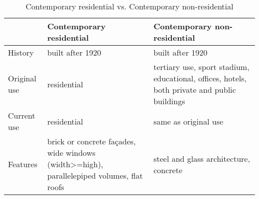  \begin{table}[htbp]
     \centering
     {\tiny
     \begin{tabular}{m{1.5cm}|m{4.9cm}|m{4.9cm}} %
            & {\bf Contemporary residential } & {\bf Contemporary non-residential} \\
            \hline\hline
           History       &  built after 1920 & built after 1920 \\
        Original use       & residential & tertiary use, sport stadium, educational, offices, hotels, both private and public buildings\\
        Current use       &residential & same as original use \\
        Features & brick or concrete façades, wide windows (width>=high), parallelepiped volumes, flat roofs  &  steel and glass architecture, concrete \\
     \end{tabular}
     }
     \caption{Contemporary residential vs. Contemporary non-residential}
     \label{tab:residential_nonresidential}
  \end{table}